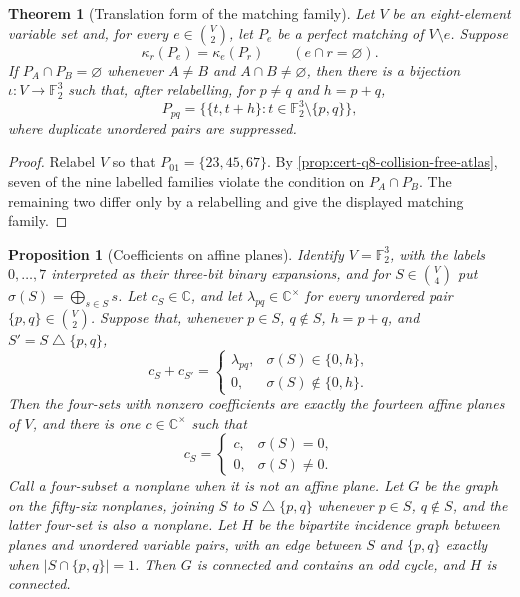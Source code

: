 \documentclass[11pt,letterpaper,onecolumn]{article}
\theoremstyle{plain}
\newtheorem{theorem}{Theorem}[section]
\newtheorem{proposition}[proposition]{Proposition}
\theoremstyle{definition}
\theoremstyle{remark}
\begin{document}
	\begin{theorem}[Translation form of the matching family]
		\label{thm:cert-q8-collision-free-interface}
		Let \(V\) be an eight-element variable set and, for every
		\(e\in\binom V2\), let \(P_e\) be a perfect matching of \(V\setminus e\).
		Suppose
		\[
		\kappa_r(P_e)=\kappa_e(P_r)
		\qquad(e\cap r=\varnothing).
		\]
		If \(P_A\cap P_B=\varnothing\) whenever \(A\ne B\) and
		\(A\cap B\ne\varnothing\), then there is a bijection
		\(\iota:V\to\mathbb F_2^3\) such that, after relabelling, for \(p\ne q\)
		and \(h=p+q\),
		\[
		P_{pq}
		=
		\bigl\{\{t,t+h\}:t\in\mathbb F_2^3\setminus\{p,q\}\bigr\},
		\]
		where duplicate unordered pairs are suppressed.
	\end{theorem}
	
	\begin{proof}
		Relabel \(V\) so that \(P_{01}=\{23,45,67\}\).  By
		\cref{prop:cert-q8-collision-free-atlas}, seven of the nine labelled
		families violate the condition on \(P_A\cap P_B\).  The remaining two
		differ only by a relabelling and give the displayed matching family.
	\end{proof}
	
	\begin{proposition}[Coefficients on affine planes]
		\label{prop:cert-q8-canonical-support}
		Identify \(V=\mathbb F_2^3\), with the labels \(0,\ldots,7\) interpreted as
		their three-bit binary expansions, and for
		\(S\in\binom V4\) put
		\(\sigma(S)=\bigoplus_{s\in S}s\).  Let \(c_S\in\mathbb C\), and let
		\(\lambda_{pq}\in\mathbb C^\times\) for every unordered pair
		\(\{p,q\}\in\binom V2\).  Suppose that, whenever \(p\in S\), \(q\notin S\),
		\(h=p+q\), and \(S'=S\mathbin\triangle\{p,q\}\),
		\begin{equation}
			c_S+c_{S'}=
			\begin{cases}
				\lambda_{pq},&\sigma(S)\in\{0,h\},\\
				0,&\sigma(S)\notin\{0,h\}.
			\end{cases}
			\label{eq:cert-q8-canonical-swap-system}
		\end{equation}
		Then the four-sets with nonzero coefficients are exactly the fourteen
		affine planes of \(V\), and there is one \(c\in\mathbb C^\times\) such that
		\begin{equation}
			c_S=
			\begin{cases}
				c,&\sigma(S)=0,\\
				0,&\sigma(S)\ne0.
			\end{cases}
			\label{eq:cert-q8-canonical-coefficients}
		\end{equation}
		Call a four-subset a \emph{nonplane} when it is not an affine plane.
		Let \(G\) be the graph on the fifty-six nonplanes, joining \(S\) to
		\(S\mathbin\triangle\{p,q\}\) whenever \(p\in S\), \(q\notin S\), and
		the latter four-set is also a nonplane.  Let \(H\) be the bipartite
		incidence graph between planes and unordered variable pairs, with an edge
		between \(S\) and \(\{p,q\}\) exactly when
		\(\lvert S\cap\{p,q\}\rvert=1\).  Then \(G\) is connected and contains
		an odd cycle, and \(H\) is connected.
	\end{proposition}
	
\end{document}
